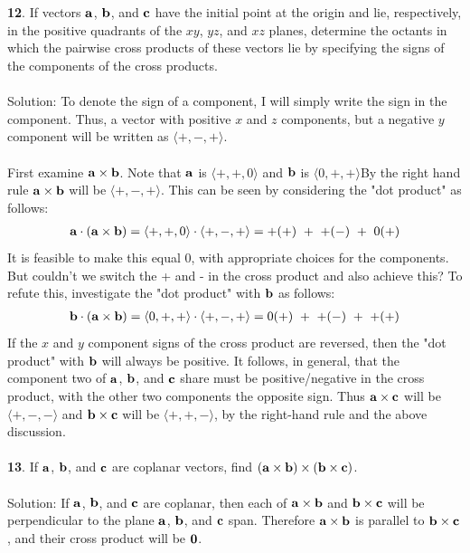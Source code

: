 \documentclass[12pt]{amsbook}
\newcommand{\la}{\langle}
\newcommand{\ra}{\rangle}
\begin{document}
\\
\\
{\small\bf 12}. If vectors ${\bf a}$, ${\bf b}$, and ${\bf c}$ have the
initial point at the origin and lie, respectively, in the positive
quadrants of the $xy$, $yz$, and $xz$ planes, determine the octants in
which the pairwise cross products of these vectors lie by specifying 
the signs of the components of the cross products.\\
\\
{\sc Solution}:
To denote the sign of a component, I will simply write the sign in the component. Thus, a vector with positive $x$ and $z$ components, but a negative $y$ component will be written as $\la +,-,+\ra$. 
\\
\\
First examine ${\bf a}\times{\bf b}$. Note that $\bf a$ is $\la +,+,0\ra$ and $\bf b$ is $\la 0,+,+ \ra$By the right hand rule ${\bf a}\times{\bf b}$ will be $\la +,-,+ \ra$. This can be seen by considering the "dot product" as follows:
\begin{eqnarray*}
{\bf a}\cdot({\bf a}\times{\bf b})=\la +,+,0\ra\cdot\la+,-,+\ra = +(+) \ + \ +(-) \ + \ 0(+) 
\end{eqnarray*}
It is feasible to make this equal 0, with appropriate choices for the components. But couldn't we switch the + and - in the cross product and also achieve this? To refute this, investigate the "dot product" with ${\bf b}$ as follows:
\begin{eqnarray*}
{\bf b}\cdot({\bf a}\times{\bf b})=\la 0,+,+\ra\cdot\la+,-,+\ra = 0(+) \ + \ +(-) \ + \ +(+) 
\end{eqnarray*}
If the $x$ and $y$ component signs of the cross product are reversed, then the "dot product" with $\bf b$ will always be positive. It follows, in general, that the component two of $\bf a$, $\bf b$, and $\bf c$ share must be positive/negative in the cross product, with the other two components the opposite sign. Thus ${\bf a}\times{\bf c}$ will be $\la +,-,- \ra$ and ${\bf b}\times{\bf c}$ will be $\la +,+,- \ra$, by the right-hand rule and the above discussion.
\\
\\
{\small\bf 13}. If ${\bf a}$, ${\bf b}$, and ${\bf c}$ are coplanar
vectors, find $({\bf a}\times{\bf b})\times ({\bf b}\times{\bf c})$.\\
\\
{\sc Solution}:
If $\bf a$, $\bf b$, and $\bf c$ are coplanar, then each of ${\bf a}\times{\bf b}$ and ${\bf b}\times{\bf c}$ will be perpendicular to the plane $\bf a$, $\bf b$, and $\bf c$ span. Therefore ${\bf a}\times{\bf b}$ is parallel to ${\bf b}\times{\bf c}$, and their cross product will be $\bf 0$.
\end{document}
